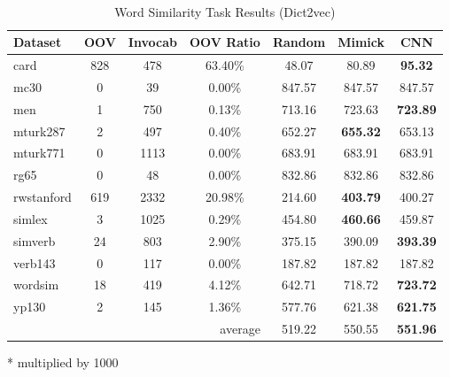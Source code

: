     \begin{table}[!ht]
      \begin{threeparttable} 
      \begin{center}
        \caption{Word Similarity Task Results (Dict2vec)}
        ~\\
        \label{tab:wordsim:dict2vec}
        \begin{tabular}{l|c|c|c|c|c|c}
          \textbf{Dataset} & \textbf{OOV} & \textbf{Invocab} &
          \textbf{OOV Ratio} & \textbf{Random}\tnote{*} &
          \textbf{Mimick}\tnote{*} & \textbf{CNN}\tnote{*}\\
          \hline
          card & 828 & 478 & 63.40\% & 48.07 & 80.89 & \textbf{95.32}\\
          mc30 & 0 & 39 & 0.00\% & 847.57 & 847.57 & 847.57\\
          men & 1 & 750 & 0.13\% & 713.16 & 723.63 & \textbf{723.89}\\
          mturk287 & 2 & 497 & 0.40\% & 652.27 & \textbf{655.32} & 653.13\\
          mturk771 & 0 & 1113 & 0.00\% & 683.91 & 683.91 & 683.91\\
          rg65 & 0 & 48 & 0.00\% & 832.86 & 832.86 & 832.86\\
          rwstanford & 619 & 2332 & 20.98\% & 214.60 & \textbf{403.79} & 400.27\\
          simlex & 3 & 1025 & 0.29\% & 454.80 & \textbf{460.66} & 459.87\\
          simverb & 24 & 803 & 2.90\% & 375.15 & 390.09 & \textbf{393.39}\\
          verb143 & 0 & 117 & 0.00\% & 187.82 & 187.82 & 187.82\\
          wordsim & 18 & 419 & 4.12\% & 642.71 & 718.72 & \textbf{723.72}\\
          yp130 & 2 & 145 & 1.36\% & 577.76 & 621.38 & \textbf{621.75}\\
          \hline
          \multicolumn{4}{r|}{average} & 519.22 & 550.55 & \textbf{551.96}\\
        \end{tabular}
        \begin{tablenotes}
          \item[*] multiplied by 1000
        \end{tablenotes}
      \end{center}
    \end{threeparttable} 
    \end{table}

